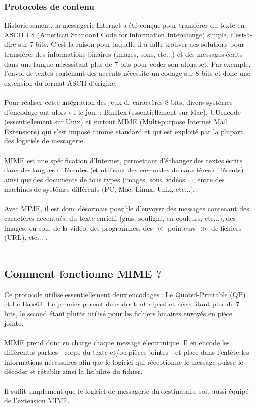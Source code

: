 \documentclass[french]{report}
\begin{document}
\subsubsection{\LARGE Protocoles de contenu}
\LARGE
Historiquement, la messagerie Internet a été conçue pour transférer du texte en ASCII US (American Standard Code for Information Interchange) simple, c'est-à-dire sur 7 bits. C'est la raison pour laquelle il a fallu trouver des solutions pour transférer des informations binaires (images, sons, etc...) et des messages écrits dans une langue nécessitant plus de 7 bits pour coder son alphabet. Par exemple, l'envoi de textes contenant des accents nécessite un codage sur 8 bits et donc une extension du format ASCII d'origine.\\ \\
Pour réaliser cette intégration des jeux de caractères 8 bits, divers systèmes d'encodage ont alors vu le jour : BinHex (essentiellement sur Mac), UUencode (essentiellement sur Unix) et surtout MIME (Multi-purpose Internet Mail Extensions) qui s'est imposé comme standard et qui est exploité par la plupart des logiciels de messagerie.\\ \\
MIME est une spécification d'Internet, permettant d'échanger des textes écrits dans des langues différentes (et utilisant des ensembles de caractères différents) ainsi que des documents de tous types (images, sons, vidéos...), entre des machines de systèmes différents (PC, Mac, Linux, Unix, etc...).\\ \\
Avec MIME, il est donc désormais possible d'envoyer des messages contenant des caractères accentués, du texte enrichi (gras, souligné, en couleurs, etc...), des images, du son, de la vidéo, des programmes, des $\ll$ pointeurs $\gg$ de fichiers (URL), etc...  .\\ \\
\subsection*{\LARGE Comment fonctionne MIME ?}
\LARGE Ce protocole utilise essentiellement deux encodages : Le Quoted-Printable (QP) et Le Base64. Le premier permet de coder tout alphabet nécessitant plus de 7 bits, le second étant plutôt utilisé pour les fichiers binaires envoyés en pièce jointe.\\ \\
MIME prend donc en charge chaque message électronique. Il en encode les différentes parties - corps du texte et/ou pièces jointes - et place dans l'entête les informations nécessaires afin que le logiciel qui réceptionne le message puisse le décoder et rétablir ainsi la lisibilité du fichier.\\ \\
Il suffit simplement que le logiciel de messagerie du destinataire soit aussi équipé de l'extension MIME.
\newpage
\end{document}

